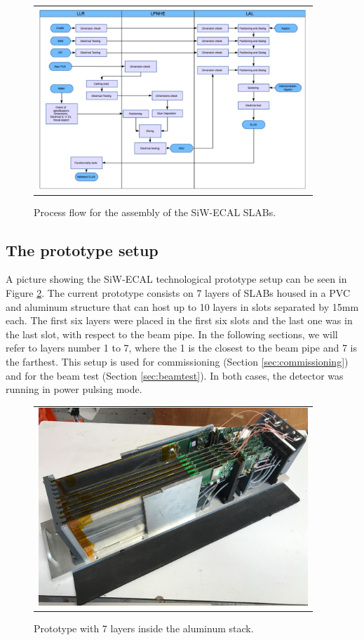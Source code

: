 \documentclass[a4paper,11pt]{article}
\begin{document}
\begin{figure}[!t]
\centering
\begin{tabular}{l}
\includegraphics[width=4.0in]{../figs/assembly.png} 
\end{tabular}
\caption{Process flow for the assembly of the SiW-ECAL SLABs.}
\label{assembly}
\end{figure}

\subsection{The prototype setup}
\label{sec:setup2}

A picture showing the SiW-ECAL technological prototype setup can be seen in Figure \ref{proto}.
The current prototype consists on 7 layers of SLABs housed in a PVC and aluminum structure that can host up to 10 layers in slots separated by 15mm each.
The first six layers were placed in the first six slots and the last one was in the last slot,
with respect to the beam pipe. In the following sections, we will refer to layers number 1 to 7, where
the 1 is the closest to the beam pipe and 7 is the farthest.
This setup is used for commissioning (Section \ref{sec:commissioning}) and for the beam test
(Section \ref{sec:beamtest}). In both cases, the detector was
running in power pulsing mode. 

\begin{figure}[!ht]
\centering
\begin{tabular}{l}
\includegraphics[width=4.0in]{../figs/proto.png} 
\end{tabular}
\caption{Prototype with 7 layers inside the aluminum stack.}
\label{proto}
\end{figure}
\end{document}
